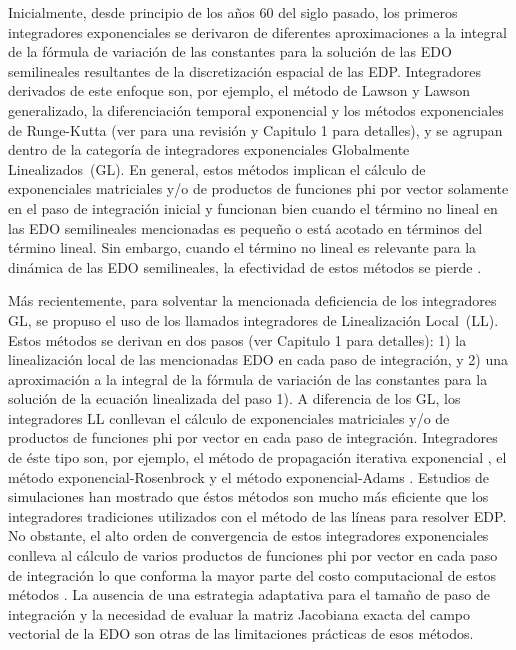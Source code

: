 Inicialmente, desde principio de los años 60 del siglo pasado, los primeros  integradores exponenciales se derivaron de diferentes aproximaciones a la integral de la fórmula de variación de las constantes para la solución de las EDO semilineales resultantes de la discretización espacial de las EDP. Integradores derivados de este enfoque son, por ejemplo, el método de Lawson y Lawson generalizado, la diferenciación temporal exponencial y los métodos exponenciales de Runge-Kutta (ver \cite{Berland07} para una revisión y Capitulo 1 para detalles), y se agrupan dentro de la categoría de integradores exponenciales Globalmente Linealizados~(GL). En general, estos métodos implican el cálculo de exponenciales matriciales y/o de productos de funciones phi por vector solamente en el paso de integración inicial y funcionan bien cuando el término no lineal en las EDO semilineales mencionadas es pequeño o está acotado en términos del término lineal. Sin embargo, cuando el término no lineal es relevante para la dinámica de las EDO semilineales, la efectividad de estos métodos se pierde \cite{hochbruck2009exponential}.


Más recientemente, para solventar la mencionada deficiencia de los integradores GL, se propuso el uso de los llamados integradores de Linealización Local~(LL). Estos métodos se derivan en dos pasos (ver Capitulo 1 para detalles): 1) la linealización local de las mencionadas EDO en cada paso de integración, y 2) una aproximación a la integral de la fórmula de variación de las constantes para la solución de la ecuación linealizada del paso 1). A diferencia de los GL, los integradores LL conllevan el cálculo de exponenciales matriciales y/o de productos de funciones phi por vector en cada paso de integración. Integradores de éste tipo son, por ejemplo, el método de propagación iterativa exponencial \cite{tokman2006efficient}, el método exponencial-Rosenbrock \cite{hochbruck2009exponential} y el método exponencial-Adams \cite{hochbruck2011exponential}. Estudios de simulaciones han mostrado que éstos métodos son mucho más eficiente que los integradores tradiciones utilizados con el método de las líneas para resolver EDP. No obstante, el alto orden de convergencia de estos integradores exponenciales conlleva al cálculo de varios productos de funciones phi por vector en cada paso de integración lo que conforma la mayor parte  del costo computacional de estos métodos \cite{naranjo2021locally}. La ausencia de una estrategia adaptativa para el tamaño de paso de integración y la necesidad de evaluar la matriz Jacobiana exacta del campo vectorial de la EDO son otras de las limitaciones prácticas de esos métodos.

